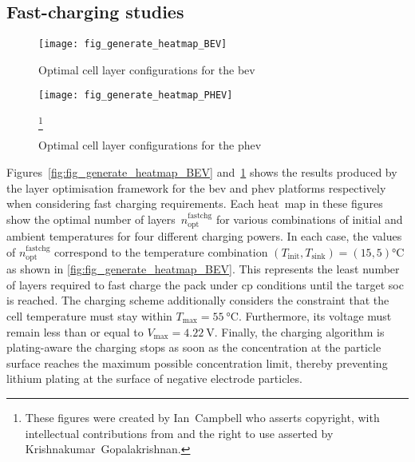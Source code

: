 \subsection{Fast-charging studies}

\begin{figure}[p]
    \begin{minipage}[t]{\textwidth}
        \centering
        \texttt{[image: fig\_generate\_heatmap\_BEV]}
        \captionsetup{labelsep=note}
        \caption[Optimal cell layer configurations for the \gls{bev}, presented for a range of fast charging powers and thermal conditions]{Optimal cell layer configurations for the \gls{bev}}
        \label{fig:fig_generate_heatmap_BEV}
        \setcounter{footnote}{8}
        \vspace*{\floatsep}
        \texttt{[image: fig\_generate\_heatmap\_PHEV]}
        \caption[Optimal cell layer configurations for the \gls{phev}, presented for a range of
        fast charging powers and thermal conditions]{Optimal cell layer configurations for the \gls{phev}}
        \label{fig:fig_generate_heatmap_PHEV}
        \mpfootnotes[1]
        \footnote{These figures were created by \mbox{Ian Campbell} who asserts copyright,
            with intellectual contributions from and the right to use asserted by
        \mbox{Krishnakumar Gopalakrishnan}.}
    \end{minipage}
\end{figure}

Figures~\ref{fig:fig_generate_heatmap_BEV}
and~\ref{fig:fig_generate_heatmap_PHEV} shows the results  produced by the layer
optimisation framework  for the \gls{bev} and  \gls{phev} platforms respectively
when  considering fast  charging requirements.  Each heat~map  in these  figures
show  the optimal  number  of  layers~$n^\text{fastchg}_\text{opt}$ for  various
combinations of  initial and  ambient temperatures  for four  different charging
powers. In each case, the  values of $n^\text{fastchg}_\text{opt}$ correspond to
the  temperature  combination  \mbox{$(T_\text{init},T_\text{sink})  =  (15,  5)
\si{\degreeCelsius}$}  as  shown  in  \cref{fig:fig_generate_heatmap_BEV}.  This
represents the  least number of  layers required to  fast charge the  pack under
\gls{cp} conditions until  the target \gls{soc} is reached.  The charging scheme
additionally considers the constraint that the cell temperature must stay within
\mbox{$T_\text{max}=  \SI{55}{\degreeCelsius}$}. Furthermore,  its voltage  must
remain less than or equal  to \mbox{$V_\text{max} = \SI{4.22}{\volt}$}. Finally,
the charging algorithm is plating-aware \ie{}  the charging stops as soon as the
concentration at the particle surface reaches the maximum possible concentration
limit, thereby preventing  lithium plating at the surface  of negative electrode
particles.


